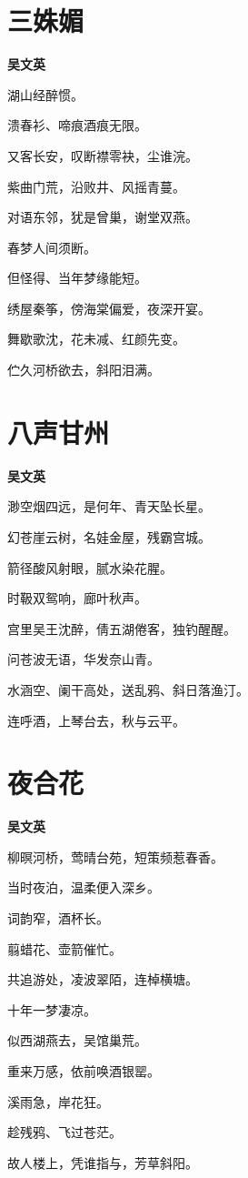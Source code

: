 \documentclass[12pt,a4paper]{ctexbook}
\begin{document}
\section{三姝媚}
\textbf{吴文英}\par\vspace{0.5em}
湖山经醉惯。\par
溃春衫、啼痕酒痕无限。\par
又客长安，叹断襟零袂，尘谁浣。\par
紫曲门荒，沿败井、风摇青蔓。\par
对语东邻，犹是曾巢，谢堂双燕。\par
春梦人间须断。\par
但怪得、当年梦缘能短。\par
绣屋秦筝，傍海棠偏爱，夜深开宴。\par
舞歇歌沈，花未减、红颜先变。\par
伫久河桥欲去，斜阳泪满。\par

\section{八声甘州}
\textbf{吴文英}\par\vspace{0.5em}
渺空烟四远，是何年、青天坠长星。\par
幻苍崖云树，名娃金屋，残霸宫城。\par
箭径酸风射眼，腻水染花腥。\par
时靸双鸳响，廊叶秋声。\par
宫里吴王沈醉，倩五湖倦客，独钓醒醒。\par
问苍波无语，华发奈山青。\par
水涵空、阑干高处，送乱鸦、斜日落渔汀。\par
连呼酒，上琴台去，秋与云平。\par

\section{夜合花}
\textbf{吴文英}\par\vspace{0.5em}
柳暝河桥，莺晴台苑，短策频惹春香。\par
当时夜泊，温柔便入深乡。\par
词韵窄，酒杯长。\par
翦蜡花、壶箭催忙。\par
共追游处，凌波翠陌，连棹横塘。\par
十年一梦凄凉。\par
似西湖燕去，吴馆巢荒。\par
重来万感，依前唤酒银罂。\par
溪雨急，岸花狂。\par
趁残鸦、飞过苍茫。\par
故人楼上，凭谁指与，芳草斜阳。\par
\end{document}
